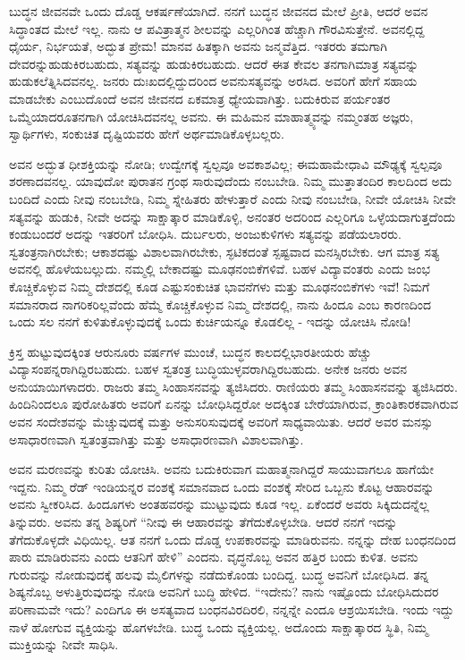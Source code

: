 ಬುದ್ಧನ ಜೀವನವೇ ಒಂದು ದೊಡ್ಡ ಆಕರ್ಷಣೆಯಾಗಿದೆ. ನನಗೆ ಬುದ್ಧನ ಜೀವನದ ಮೇಲೆ ಪ್ರೀತಿ, ಆದರೆ ಅವನ ಸಿದ್ಧಾಂತದ ಮೇಲೆ ಇಲ್ಲ. ನಾನು ಆ ಪವಿತ್ರಾತ್ಮನ ಶೀಲವನ್ನು ಎಲ್ಲರಿಗಿಂತ ಹೆಚ್ಚಾಗಿ ಗೌರವಿಸುತ್ತೇನೆ. ಅವನಲ್ಲಿದ್ದ ಧೈರ್ಯ, ನಿರ್ಭಯತೆ, ಅದ್ಭುತ ಪ್ರೇಮ! ಮಾನವ ಹಿತಕ್ಕಾಗಿ ಅವನು ಜನ್ಮವೆತ್ತಿದ. ಇತರರು ತಮಗಾಗಿ ದೇವರನ್ನು\break ಹುಡುಕಿರಬಹುದು, ಸತ್ಯವನ್ನು ಹುಡುಕಿರಬಹುದು. ಆದರೆ ಈತ ಕೇವಲ ತನಗಾಗಿ\break ಮಾತ್ರ ಸತ್ಯವನ್ನು ಹುಡುಕಲೆತ್ನಿಸಿದವನಲ್ಲ. ಜನರು ದುಃಖದಲ್ಲಿದ್ದುದರಿಂದ ಅವನು\break ಸತ್ಯವನ್ನು ಅರಸಿದ. ಅವರಿಗೆ ಹೇಗೆ ಸಹಾಯ ಮಾಡಬೇಕು ಎಂಬುದೊಂದೆ ಅವನ ಜೀವನದ ಏಕಮಾತ್ರ ಧ್ಯೇಯವಾಗಿತ್ತು. ಬದುಕಿರುವ ಪರ್ಯಂತರ ಒಮ್ಮೆಯಾದರೂ\break ತನಗಾಗಿ ಯೋಚಿಸಿದವನಲ್ಲ ಅವನು. ಈ ಮಹಿಮನ ಮಾಹಾತ್ಮ್ಯವನ್ನು ನಮ್ಮಂತಹ ಅಜ್ಞರು, ಸ್ವಾರ್ಥಿಗಳು, ಸಂಕುಚಿತ ದೃಷ್ಟಿಯವರು ಹೇಗೆ ಅರ್ಥಮಾಡಿಕೊಳ್ಳಬಲ್ಲರು.

ಅವನ ಅದ್ಭುತ ಧೀಶಕ್ತಿಯನ್ನು ನೋಡಿ; ಉದ್ವೇಗಕ್ಕೆ ಸ್ವಲ್ಪವೂ ಅವಕಾಶವಿಲ್ಲ; ಈ\break ಮಹಾಮೇಧಾವಿ ಮೌಢ್ಯಕ್ಕೆ ಸ್ವಲ್ಪವೂ ಶರಣಾದವನಲ್ಲ. ಯಾವುದೋ ಪುರಾತನ ಗ್ರಂಥ ಸಾರುವುದೆಂದು ನಂಬಬೇಡಿ. ನಿಮ್ಮ ಮುತ್ತಾತಂದಿರ ಕಾಲದಿಂದ ಅದು ಬಂದಿದೆ ಎಂದು ನೀವು ನಂಬಬೇಡಿ, ನಿಮ್ಮ ಸ್ನೇಹಿತರು ಹೇಳುತ್ತಾರೆ ಎಂದು ನೀವು ನಂಬಬೇಡಿ, ನೀವೇ ಯೋಚಿಸಿ ನೀವೇ ಸತ್ಯವನ್ನು ಹುಡುಕಿ, ನೀವೇ ಅದನ್ನು ಸಾಕ್ಷಾತ್ಕಾರ ಮಾಡಿಕೊಳ್ಳಿ, ಅನಂತರ ಅದರಿಂದ ಎಲ್ಲರಿಗೂ ಒಳ್ಳೆಯದಾಗುತ್ತದೆಂದು ಕಂಡುಬಂದರೆ ಅದನ್ನು ಇತರರಿಗೆ ಬೋಧಿಸಿ. ದುರ್ಬಲರು, ಅಂಜುಕುಳಿಗಳು ಸತ್ಯವನ್ನು ಪಡೆಯಲಾರರು. ಸ್ವತಂತ್ರನಾಗಿರಬೇಕು; ಆಕಾಶದಷ್ಟು ವಿಶಾಲವಾಗಿರಬೇಕು, ಸ್ಫಟಿಕದಂತೆ ಸ್ಪಷ್ಟವಾದ ಮನಸ್ಸಿರಬೇಕು. ಆಗ ಮಾತ್ರ ಸತ್ಯ ಅವನಲ್ಲಿ ಹೊಳೆಯಬಲ್ಲುದು. ನಮ್ಮಲ್ಲಿ ಬೇಕಾದಷ್ಟು ಮೂಢನಂಬಿಕೆಗಳಿವೆ. ಬಹಳ ವಿದ್ಯಾವಂತರು ಎಂದು ಜಂಭ ಕೊಚ್ಚಿಕೊಳ್ಳುವ ನಿಮ್ಮ ದೇಶದಲ್ಲಿ ಕೂಡ ಎಷ್ಟು\break ಸಂಕುಚಿತ ಭಾವನೆಗಳು ಮತ್ತು ಮೂಢನಂಬಿಕೆಗಳು ಇವೆ! ನಿಮಗೆ ಸಮಾನರಾದ ನಾಗರಿಕರಿಲ್ಲವೆಂದು ಹೆಮ್ಮೆ ಕೊಚ್ಚಿಕೊಳ್ಳುವ ನಿಮ್ಮ ದೇಶದಲ್ಲಿ, ನಾನು ಹಿಂದೂ ಎಂಬ ಕಾರಣದಿಂದ ಒಂದು ಸಲ ನನಗೆ ಕುಳಿತುಕೊಳ್ಳುವುದಕ್ಕೆ ಒಂದು ಕುರ್ಚಿಯನ್ನೂ ಕೊಡಲಿಲ್ಲ - ಇದನ್ನು ಯೋಚಿಸಿ ನೋಡಿ!

ಕ್ರಿಸ್ತ ಹುಟ್ಟುವುದಕ್ಕಿಂತ ಆರುನೂರು ವರ್ಷಗಳ ಮುಂಚೆ, ಬುದ್ಧನ ಕಾಲದಲ್ಲಿ\break ಭಾರತೀಯರು ಹೆಚ್ಚು ವಿದ್ಯಾಸಂಪನ್ನರಾಗಿದ್ದಿರಬಹುದು. ಬಹಳ ಸ್ವತಂತ್ರ ಬುದ್ಧಿಯುಳ್ಳವ\-ರಾಗಿದ್ದಿರಬಹುದು. ಅನೇಕ ಜನರು ಅವನ ಅನುಯಾಯಿಗಳಾದರು. ರಾಜರು ತಮ್ಮ ಸಿಂಹಾಸನವನ್ನು ತ್ಯಜಿಸಿದರು. ರಾಣಿಯರು ತಮ್ಮ ಸಿಂಹಾಸನವನ್ನು ತ್ಯಜಿಸಿದರು. ಹಿಂದಿನಿಂದಲೂ ಪುರೋಹಿತರು ಅವರಿಗೆ ಏನನ್ನು ಬೋಧಿಸಿದ್ದರೋ ಅದಕ್ಕಿಂತ ಬೇರೆಯಾಗಿರುವ, ಕ್ರಾಂತಿಕಾರಕವಾಗಿರುವ ಅವನ ಸಂದೇಶವನ್ನು ಮೆಚ್ಚುವುದಕ್ಕೆ ಮತ್ತು ಅನುಸರಿಸುವುದಕ್ಕೆ ಅವರಿಗೆ ಸಾಧ್ಯವಾಯಿತು. ಆದರೆ ಅವರ ಮನಸ್ಸು ಅಸಾಧಾರಣವಾಗಿ ಸ್ವತಂತ್ರವಾಗಿತ್ತು ಮತ್ತು ಅಸಾಧಾರಣವಾಗಿ ವಿಶಾಲವಾಗಿತ್ತು.

ಅವನ ಮರಣವನ್ನು ಕುರಿತು ಯೋಚಿಸಿ. ಅವನು ಬದುಕಿರುವಾಗ ಮಹಾತ್ಮನಾಗಿದ್ದರೆ ಸಾಯುವಾಗಲೂ ಹಾಗೆಯೇ ಇದ್ದನು. ನಿಮ್ಮ ರೆಡ್​ ಇಂಡಿಯನ್ನರ ವಂಶಕ್ಕೆ ಸಮಾನವಾದ ಒಂದು ವಂಶಕ್ಕೆ ಸೇರಿದ ಒಬ್ಬನು ಕೊಟ್ಟ ಆಹಾರವನ್ನು ಅವನು ಸ್ವೀಕರಿಸಿದ. ಹಿಂದೂಗಳು ಅಂತಹವರನ್ನು ಮುಟ್ಟುವುದು ಕೂಡ ಇಲ್ಲ. ಏಕೆಂದರೆ ಅವರು ಸಿಕ್ಕಿದುದನ್ನೆಲ್ಲ ತಿನ್ನುವರು. ಅವನು ತನ್ನ ಶಿಷ್ಯರಿಗೆ “ನೀವು ಈ ಆಹಾರವನ್ನು ತೆಗೆದುಕೊಳ್ಳಬೇಡಿ. ಆದರೆ ನನಗೆ ಇದನ್ನು ತೆಗೆದುಕೊಳ್ಳದೇ ವಿಧಿಯಿಲ್ಲ. ಆತ ನನಗೆ ಒಂದು ದೊಡ್ಡ ಉಪಕಾರವನ್ನು ಮಾಡಿರುವನು. ನನ್ನನ್ನು ದೇಹ ಬಂಧನದಿಂದ ಪಾರು ಮಾಡಿರುವನು ಎಂದು ಆತನಿಗೆ ಹೇಳಿ” ಎಂದನು. ವೃದ್ಧನೊಬ್ಬ ಅವನ ಹತ್ತಿರ ಬಂದು ಕುಳಿತ. ಅವನು ಗುರುವನ್ನು ನೋಡುವುದಕ್ಕೆ ಹಲವು ಮೈಲಿಗಳನ್ನು ನಡೆದುಕೊಂಡು ಬಂದಿದ್ದ. ಬುದ್ಧ ಅವನಿಗೆ ಬೋಧಿಸಿದ. ತನ್ನ ಶಿಷ್ಯನೊಬ್ಬ ಅಳುತ್ತಿರುವುದನ್ನು ನೋಡಿ ಅವನಿಗೆ ಬುದ್ಧಿ ಹೇಳಿದ. “ಇದೇನು? ನಾನು ಇಷ್ಟೊಂದು ಬೋಧಿಸಿದುದರ ಪರಿಣಾಮವೇ ಇದು? ಎಂದಿಗೂ ಈ ಅಸತ್ಯವಾದ ಬಂಧನವಿರದಿರಲಿ, ನನ್ನನ್ನೇ ಎಂದೂ ಆಶ್ರಯಿಸಬೇಡಿ. ಇಂದು ಇದ್ದು ನಾಳೆ ಹೋಗುವ ವ್ಯಕ್ತಿಯನ್ನು ಹೊಗಳಬೇಡಿ. ಬುದ್ಧ ಒಂದು ವ್ಯಕ್ತಿಯಲ್ಲ. ಅದೊಂದು ಸಾಕ್ಷಾತ್ಕಾರದ ಸ್ಥಿತಿ, ನಿಮ್ಮ ಮುಕ್ತಿಯನ್ನು ನೀವೇ ಸಾಧಿಸಿ.

